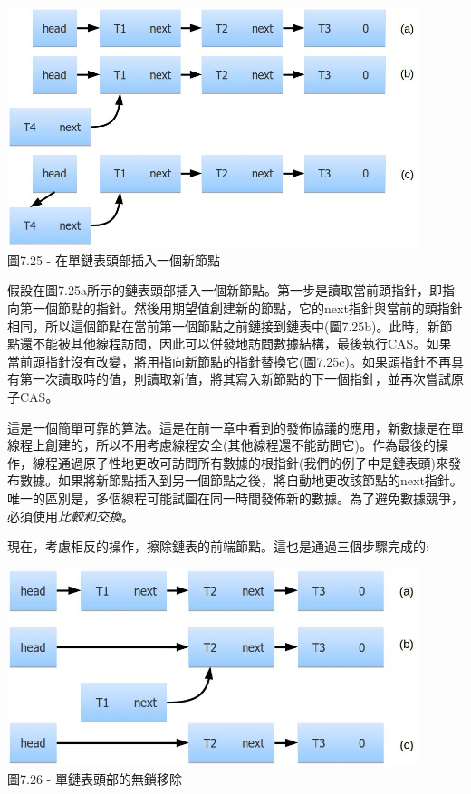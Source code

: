 \begin{center}
\includegraphics[width=0.9\textwidth]{content/2/chapter7/images/25.jpg}\\
圖7.25 - 在單鏈表頭部插入一個新節點
\end{center}

假設在圖7.25a所示的鏈表頭部插入一個新節點。第一步是讀取當前頭指針，即指向第一個節點的指針。然後用期望值創建新的節點，它的next指針與當前的頭指針相同，所以這個節點在當前第一個節點之前鏈接到鏈表中(圖7.25b)。此時，新節點還不能被其他線程訪問，因此可以併發地訪問數據結構，最後執行CAS。如果當前頭指針沒有改變，將用指向新節點的指針替換它(圖7.25c)。如果頭指針不再具有第一次讀取時的值，則讀取新值，將其寫入新節點的下一個指針，並再次嘗試原子CAS。

這是一個簡單可靠的算法。這是在前一章中看到的發佈協議的應用，新數據是在單線程上創建的，所以不用考慮線程安全(其他線程還不能訪問它)。作為最後的操作，線程通過原子性地更改可訪問所有數據的根指針(我們的例子中是鏈表頭)來發布數據。如果將新節點插入到另一個節點之後，將自動地更改該節點的next指針。唯一的區別是，多個線程可能試圖在同一時間發佈新的數據。為了避免數據競爭，必須使用\textit{比較和交換}。 

現在，考慮相反的操作，擦除鏈表的前端節點。這也是通過三個步驟完成的:

\begin{center}
\includegraphics[width=0.9\textwidth]{content/2/chapter7/images/26.jpg}\\
圖7.26 - 單鏈表頭部的無鎖移除
\end{center}

